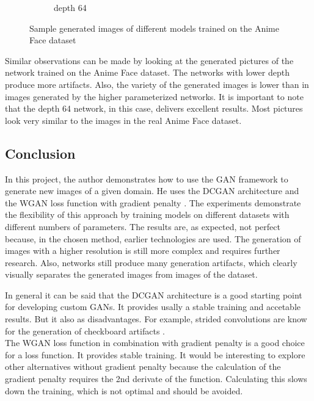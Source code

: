 \begin{figure}[H]
\begin{subfigure}[b]{0.24\textwidth}
        \caption{depth 64}
        \label{fig:anime_64}
    \end{subfigure}
    \caption{Sample generated images of different models trained on the Anime Face dataset}
    \label{fig:ouput_anime}
\end{figure}

Similar observations can be made by looking at the generated pictures of the network trained on the Anime Face dataset. The networks with lower depth produce more artifacts. Also, the variety of the generated images is lower than in images generated by the higher parameterized networks. It is important to note that the depth 64 network, in this case, delivers excellent results. Most pictures look very similar to the images in the real Anime Face dataset. 

\subsection{Conclusion}

In this project, the author demonstrates how to use the GAN \cite{goodfellow2014generative} framework to generate new images of a given domain. He uses the DCGAN \cite{radford2016dcgan} architecture and the WGAN \cite{arjovsky2017wgan} loss function with gradient penalty \cite{gulrajani2017wgangp}. The experiments demonstrate the flexibility of this approach by training models on different datasets with different numbers of parameters. The results are, as expected, not perfect because, in the chosen method, earlier technologies are used. The generation of images with a higher resolution is still more complex and requires further research. Also, networks still produce many generation artifacts, which clearly visually separates the generated images from images of the dataset. \\

\newpage

In general it can be said that the DCGAN architecture is a good starting point for developing custom GANs. It provides usally a stable training and accetable results. But it also as disadvantages. For example, strided convolutions are know for the generation of checkboard artifacts \cite{odena2016deconvolutioncheckerboard}. \\

The WGAN loss function in combination with gradient penalty is a good choice for a loss function. It provides stable training. It would be interesting to explore other alternatives without gradient penalty because the calculation of the gradient penalty requires the 2nd derivate of the function. Calculating this slows down the training, which is not optimal and should be avoided. \\

